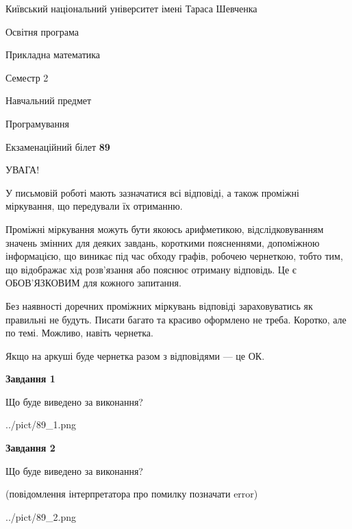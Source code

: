 \documentclass[12pt, ukrainian]{article}
\begin{document}
{{\begin {small}\par
{ \center  Київський національний університет імені Тараса Шевченка \par}
{\parbox {5 cm}{Освітня програма \hfill}{\parbox {7 cm}{Прикладна математика\hfill}}\parbox {6 cm}{\hfill Семестр 2}}\par
{\parbox {5 cm} {Навчальний предмет \hfill}\parbox {7 cm}{Програмування \hfill}\parbox {6cm}{\hfill}\par}\vspace{-7pt} \end{small}}{\center Екзаменаційний білет \No \textbf
{ 89 }\par}}
{
\begin {large}
УВАГА!

У письмовій роботі мають зазначатися всі відповіді, а також проміжні міркування, що передували їх отриманню.

Проміжні міркування можуть бути якоюсь арифметикою, відслідковуванням зна\-чень змінних для деяких завдань,
короткими поясненнями, допоміжною інформацією, що виникає під час обходу графів, робочею чернеткою,
тобто тим, що відображає хід розв’язання або пояснює отриману відповідь.
Це є ОБОВ’ЯЗКОВИМ для кожного запитання.

Без наявності доречних проміжних міркувань відповіді зараховуватись як правиль\-ні не будуть.
Писати багато та красиво оформлено не треба. Коротко, але по темі. Можли\-во, навіть чернетка.

Якщо на аркуші буде чернетка разом з відповідями --- це ОК.

\newpage

{\begin {center}\textbf{Завдання 1}\end {center}}\par
Що буде виведено за виконання?\par
\begin{center}
	{../pict/89_1.png}
\end{center}
\newpage

{\begin {center}\textbf{Завдання 2}\end {center}}\par
Що буде виведено за виконання?\par
 (повідомлення інтерпретатора про помилку позначати error)\par
\begin{center}
	{../pict/89_2.png}
\end{center}
\newpage


\end{large}}
\end{document}
